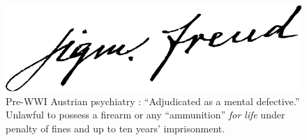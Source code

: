 \documentclass[letterpaper]{article}
\begin{document}
\begin{figure}
\begin{minipage}{0.45\textwidth}
	\includegraphics[width=1.0\textwidth]{683px-FreudSignature.png}
	\end{minipage}
	\caption[Adjudicated as a mental defective]{Pre-WWI Austrian psychiatry \cite{unknown1909,halberstadt1940,jung-sig,freud-sig,jung-sig-src,freud-sig-src}: ``Adjudicated as a mental defective.'' Unlawful to possess a firearm or any ``ammunition'' \textit{for life} under penalty of fines and up to ten years' imprisonment.}
\end{figure}
\end{document}
